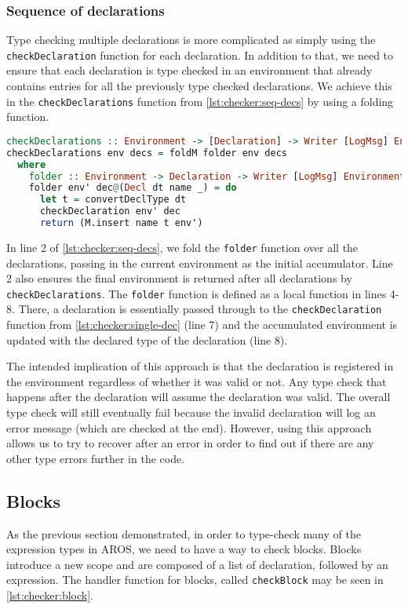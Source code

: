 \subsubsection{Sequence of declarations}
Type checking multiple declarations is more complicated as simply using the \lstinline{checkDeclaration} function for each declaration. In addition to that, we need to ensure that each declaration is type checked in an environment that already contains entries for all the previously type checked declarations. We achieve this in the \lstinline{checkDeclarations} function from \cref{lst:checker:seq-decs} by using a folding function.

\begin{lstlisting}[language=haskell,
caption={Function for type checking a sequence of declarations},
label=lst:checker:seq-decs]
checkDeclarations :: Environment -> [Declaration] -> Writer [LogMsg] Environment
checkDeclarations env decs = foldM folder env decs
  where
    folder :: Environment -> Declaration -> Writer [LogMsg] Environment
    folder env' dec@(Decl dt name _) = do
      let t = convertDeclType dt
      checkDeclaration env' dec
      return (M.insert name t env')
\end{lstlisting}

\par In line 2 of \cref{lst:checker:seq-decs}, we fold the \lstinline{folder} function over all the declarations, passing in the current environment as the initial accumulator. Line 2 also ensures the final environment is returned after all declarations by \lstinline{checkDeclarations}. The \lstinline{folder} function is defined as a local function in lines 4-8. There, a declaration is essentially passed through to the \lstinline{checkDeclaration} function from \cref{lst:checker:single-dec} (line 7) and the accumulated environment is updated with the declared type of the declaration (line 8). 
\par The intended implication of this approach is that the declaration is registered in the environment regardless of whether it was valid or not. Any type check that happens after the declaration will assume the declaration was valid. The overall type check will still eventually fail because the invalid declaration will log an error message (which are checked at the end). However, using this approach allows us to try to recover after an error in order to find out if there are any other type errors further in the code.    


\subsection{Blocks}
\label{sec:checker:blocks}
As the previous section demonstrated, in order to type-check many of the expression types in AROS, we need to have a way to check blocks. Blocks introduce a new scope and are composed of a list of declaration, followed by an expression. The handler function for blocks, called \lstinline{checkBlock} may be seen in \cref{lst:checker:block}.

